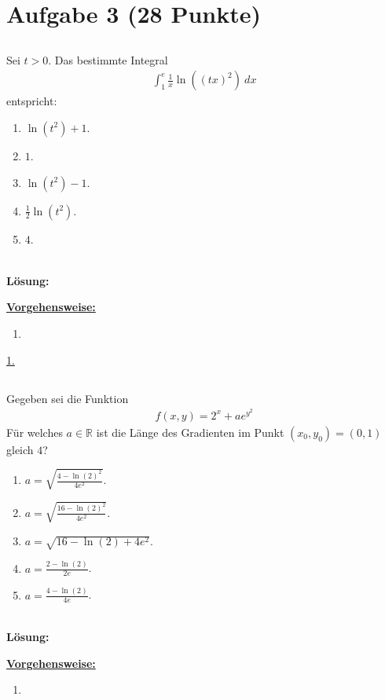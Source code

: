 \section*{Aufgabe 3 (28 Punkte)}
\vspace{0.4cm}
\subsection*{}
Sei $t > 0$. Das bestimmte Integral
\begin{align*}
	\int_1^e \frac{1}{x} \ln\left((tx)^2\right) \ dx
\end{align*}
entspricht:
\renewcommand{\labelenumi}{(\alph{enumi})}
\begin{enumerate}
	\item 
	$ \ln(t^2)  +1  $.
	\item
	$ 1 $.
	\item
	$ \ln(t^2) -1 $.
	\item 
	$\frac{1}{2} \ln(t^2)$.
	\item $4$.
\end{enumerate}
\ \\
\textbf{Lösung:}
\begin{mdframed}
\underline{\textbf{Vorgehensweise:}}
\renewcommand{\labelenumi}{\theenumi.}
\begin{enumerate}
\item 
\end{enumerate}
\end{mdframed}

\underline{1. }\\


 
\newpage

\subsection*{}
Gegeben sei die Funktion
\begin{align*}
	f(x,y) = 2^x +  a e^{y^2}
\end{align*}
Für welches $a \in \mathbb{R}$ ist die Länge des Gradienten im Punkt $(x_0,y_0) = (0,1)$ gleich $4$?
\renewcommand{\labelenumi}{(\alph{enumi})}
\begin{enumerate}
	\item 
	$a = \sqrt{\frac{4 - \ln(2)^2}{4 e^2}} $.
	\item
	$a = \sqrt{\frac{16 - \ln(2)^2}{4 e^2}}$.
	\item
	$a = \sqrt{16 - \ln(2) + 4 e^2}$.
	\item
	$a = \frac{2 - \ln(2)}{2 e }$.
	\item 
	$a = \frac{4 - \ln(2)}{4e}$.
\end{enumerate}
\ \\
\textbf{Lösung:}
\begin{mdframed}
\underline{\textbf{Vorgehensweise:}}
\renewcommand{\labelenumi}{\theenumi.}
\begin{enumerate}
\item 
\end{enumerate}
\end{mdframed}

